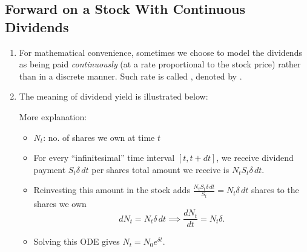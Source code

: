 \subsection{Forward on a Stock With Continuous Dividends}
\begin{enumerate}
\item For mathematical convenience, sometimes we choose to model the dividends
as being paid \emph{continuously} (at a rate proportional to the stock price)
rather than in a discrete manner. Such rate is called ,
denoted by .
\item The meaning of dividend yield is illustrated below:
\begin{center}
\end{center}
More explanation:
\begin{itemize}
\item \(N_t\): no. of  shares we own at time \(t\)
\item For every ``infinitesimal'' time interval \([t,t+dt]\), we receive
dividend payment  \(S_{t}\delta\,dt\) per shares
 total amount we receive is \(N_tS_t\delta\,dt\).
\item Reinvesting this amount in the stock  adds
\(\displaystyle \frac{N_tS_t\delta\,dt}{S_t}=N_t\delta\,dt\) 
shares to the shares we own 
\[dN_t=N_t\delta\,dt \implies
\frac{dN_t}{dt}=N_t\delta.\]
\item Solving this ODE gives \(N_t=N_0e^{\delta t}\).
\end{itemize}
\begin{note}

\end{note}
\end{enumerate}
